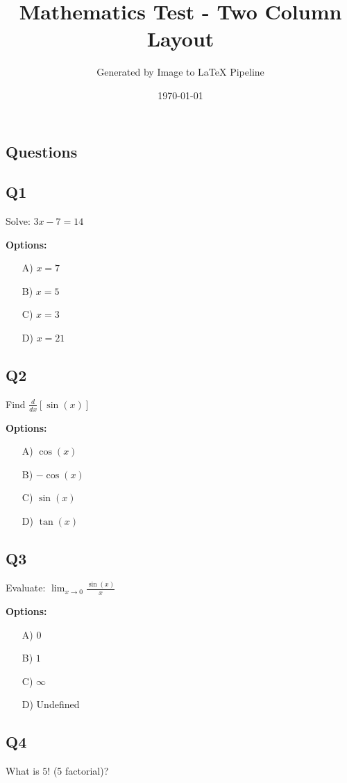 \documentclass[12pt]{article}
\title{Mathematics Test - Two Column Layout}
\author{Generated by Image to LaTeX Pipeline}
\date{\today}
\begin{document}
\maketitle

\begin{multicols}{2}

\section*{Questions}

\subsection*{Q1}
Solve: $3x - 7 = 14$

\textbf{Options:}
\begin{itemize}
    \item[A)] $x = 7$
    \item[B)] $x = 5$
    \item[C)] $x = 3$
    \item[D)] $x = 21$
\end{itemize}

\subsection*{Q2}
Find $\frac{d}{dx}[\sin(x)]$

\textbf{Options:}
\begin{itemize}
    \item[A)] $\cos(x)$
    \item[B)] $-\cos(x)$
    \item[C)] $\sin(x)$
    \item[D)] $\tan(x)$
\end{itemize}

\subsection*{Q3}
Evaluate: $\lim_{x \to 0} \frac{\sin(x)}{x}$

\textbf{Options:}
\begin{itemize}
    \item[A)] $0$
    \item[B)] $1$
    \item[C)] $\infty$
    \item[D)] Undefined
\end{itemize}

\subsection*{Q4}
What is $5!$ (5 factorial)?


\end{multicols}
\end{document}
